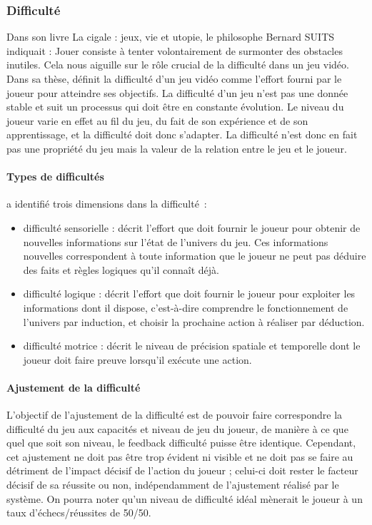 \documentclass[french, 12pt]{article} %
\begin{document}
		\subsubsection{Difficulté}
Dans son livre La cigale : jeux, vie et utopie, le philosophe Bernard SUITS indiquait : \og Jouer consiste à tenter volontairement de surmonter des obstacles inutiles. \fg{}
Cela nous aiguille sur le rôle crucial de la difficulté dans un jeu vidéo. \\
Dans sa thèse, \cite{Levi11} définit la difficulté d'un jeu vidéo comme l'effort fourni par le joueur pour atteindre ses objectifs. La difficulté d'un jeu n'est pas une donnée stable et suit un processus qui doit être en constante évolution. Le niveau du joueur varie en effet au fil du jeu, du fait de son expérience et de son apprentissage, et la difficulté doit donc s'adapter. La difficulté n'est donc en fait pas une propriété du jeu mais la valeur de la relation entre le jeu et le joueur.

			\paragraph{Types de difficultés\\}
\cite{Levi11} a identifié trois dimensions dans la difficulté~:
\begin{itemize}
	\item difficulté sensorielle : décrit l'effort que doit fournir le joueur pour obtenir de nouvelles informations sur l'état de l'univers du jeu. Ces informations nouvelles correspondent à toute information que le joueur ne peut pas déduire des faits et règles logiques qu'il connaît déjà.
	\item difficulté logique : décrit l'effort que doit fournir le joueur pour exploiter les informations dont il dispose, c'est-à-dire comprendre le fonctionnement de l'univers par induction, et choisir la prochaine action à réaliser par déduction.
	\item difficulté motrice : décrit le niveau de précision spatiale et temporelle dont le joueur doit faire preuve lorsqu'il exécute une action.	
\end{itemize}
	
			\paragraph{Ajustement de la difficulté\\}
L'objectif de l'ajustement de la difficulté est de pouvoir faire correspondre la difficulté du jeu aux capacités et niveau de jeu du joueur, de manière à ce que quel que soit son niveau, le feedback difficulté puisse être identique. Cependant, cet ajustement ne doit pas être trop évident ni visible et ne doit pas se faire au détriment de l'impact décisif de l'action du joueur\cite{Roll03} ; celui-ci doit rester le facteur décisif de sa réussite ou non, indépendamment de l'ajustement réalisé par le système. On pourra noter qu'un niveau de difficulté idéal mènerait le joueur à un taux d'échecs/réussites de 50/50.
\end{document}
